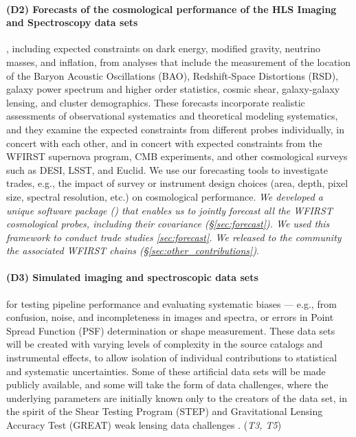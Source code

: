 \paragraph*{(D2) Forecasts of the cosmological performance of the HLS Imaging
and Spectroscopy data sets}, including expected constraints on dark energy,
modified gravity, neutrino masses, and inflation, from analyses that include the
measurement of the location of the Baryon Acoustic Oscillations (BAO),
Redshift-Space Distortions (RSD), galaxy power spectrum and higher order
statistics, cosmic shear, galaxy-galaxy lensing, and cluster demographics. These
forecasts incorporate realistic assessments of observational systematics and
theoretical modeling systematics, and they examine the expected constraints from
different probes individually, in concert with each other, and in concert with
expected constraints from the WFIRST supernova program, CMB experiments, and
other cosmological surveys such as DESI, LSST, and Euclid. We use our
forecasting tools to investigate trades, e.g., the impact of survey or
instrument design choices (area, depth, pixel size, spectral resolution, etc.)
on cosmological performance. \emph{We developed a unique software package (\CoLi) that
enables us to jointly forecast all the WFIRST cosmological probes, including
their covariance (\S \ref{sec:forecast}). We used this framework to conduct trade studies \ref{sec:forecast}. We released to the community the
associated WFIRST chains (\S \ref{sec:other_contributions})}.

\paragraph{(D3) Simulated imaging and spectroscopic data sets} for testing pipeline
performance and evaluating systematic biases --- e.g., from confusion,
noise, and incompleteness in images and spectra, or errors in Point
Spread Function (PSF) determination or shape measurement.
These data sets will be created with varying levels of complexity
in the source catalogs and instrumental effects, to allow isolation
of individual contributions to statistical and systematic uncertainties.
Some of these artificial data sets will be made publicly available,
and some will take the form of data challenges, where the underlying
parameters are initially known only to the creators of the data set,
in the spirit of the Shear Testing Program (STEP) and Gravitational
Lensing Accuracy Test (GREAT) weak lensing data
challenges \cite{Heymans2006, Massey2007, Bridle2010, Kitching2012, Mandelbaum2015}.
 (\textit{T3, T5})

